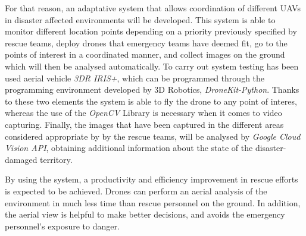 For that reason, an adaptative system that allows coordination of different \acs{UAV}s in disaster affected environments will be developed. This system is able to monitor different location points depending on a priority previously specified by rescue teams, deploy drones that emergency teams have deemed fit, go to the points of interest in a coordinated manner, and collect images on the ground which will then be analysed automatically. To carry out system testing has been used aerial vehicle \textit{3DR IRIS+}, which can be programmed through the programming environment developed by 3D Robotics, \textit{DroneKit-Python}. Thanks to these two elements the system is able to fly the drone to any point of interes, whereas the use of the \textit{OpenCV} Library is necessary when it comes to video capturing. Finally, the images that have been captured in the different areas considered appropriate by by the rescue teams, will be analysed by \textit{Google Cloud Vision \acs{API}}, obtaining additional information about the state of the disaster-damaged territory.

By using the system, a productivity and efficiency improvement in rescue efforts is expected to be achieved. Drones can perform an aerial analysis of the environment in much less time than rescue personnel on the ground. In addition, the aerial view is helpful to make better decisions, and avoids the emergency personnel's exposure to danger.
